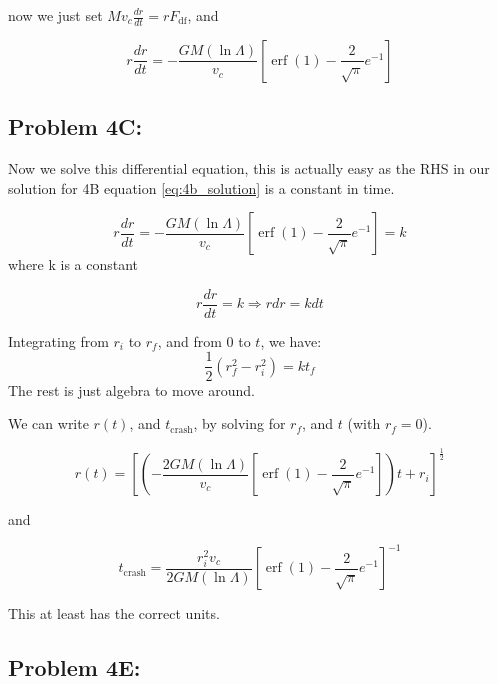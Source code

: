 now we just set $Mv_c\frac{dr}{dt} = rF_{\mathrm{df}}$, and 

\begin{equation}\label{eq:4b_solution}
    \boxed{r\frac{dr}{dt} = -\frac{GM(\ln \Lambda)}{v_c}[\operatorname{erf}(1) - \frac{2}  {\sqrt{\pi}}e^{-1}]}
\end{equation}

\subsection*{Problem 4C:}
Now we solve this differential equation, this is actually easy as the RHS in our solution for 4B equation \ref{eq:4b_solution} is a constant in time. 


\begin{equation}
    r\frac{dr}{dt} = -\frac{GM(\ln \Lambda)}{v_c}[\operatorname{erf}(1) - \frac{2}  {\sqrt{\pi}}e^{-1}] = k
\end{equation}
where k is a constant 

\begin{equation}
    r\frac{dr}{dt}  = k \Rightarrow rdr = kdt
\end{equation}

Integrating from $r_i$ to $r_f$, and from $0$ to $t$, we have:
\begin{equation}
    \frac{1}{2} (r_f^2 - r_i^2) = kt_f
\end{equation}
The rest is just algebra to move around.

We can write $r(t)$, and $t_{\mathrm{crash}}$, by solving for $r_f$, and $t$ (with $r_f =0$). 

\begin{equation} \label{eq:4_r_t}
    r(t) = [(-\frac{2GM(\ln \Lambda)}{v_c}[\operatorname{erf}(1) - \frac{2}  {\sqrt{\pi}}e^{-1}])t + r_i]^{\frac{1}{2}}
\end{equation}

and 

\begin{equation}
    \boxed{t_{\mathrm{crash}} = \frac{r_i^2v_c}{ 2G M(\ln \Lambda)}[\operatorname{erf}(1) - \frac{2}  {\sqrt{\pi}}e^{-1}]^{-1}}
\end{equation}

This at least has the correct units. 

\subsection*{Problem 4E:}













